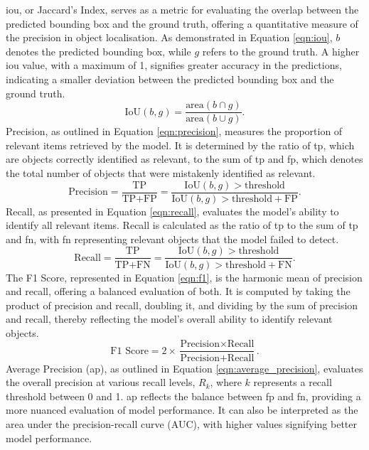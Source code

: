 \gls{iou}, or Jaccard’s Index, serves as a metric for evaluating the overlap between the predicted bounding box and the ground truth, offering a quantitative measure of the precision in object localisation. As demonstrated in Equation \ref{eqn:iou}, $b$ denotes the predicted bounding box, while $g$ refers to the ground truth. A higher \gls{iou} value, with a maximum of 1, signifies greater accuracy in the predictions, indicating a smaller deviation between the predicted bounding box and the ground truth.
\begin{equation}
\label{eqn:iou}
\text{IoU}(b, g) = \frac{{\text{area}(b \cap g)}}{{\text{area}(b \cup g)}}.
\end{equation}
Precision, as outlined in Equation \ref{eqn:precision}, measures the proportion of relevant items retrieved by the model. It is determined by the ratio of \gls{tp}, which are objects correctly identified as relevant, to the sum of \gls{tp} and \gls{fp}, which denotes the total number of objects that were mistakenly identified as relevant.
\begin{equation}
\text{Precision} = \frac{\text{TP}}{\text{TP} + \text{FP}} = \frac{\text{IoU}(b, g) > \text{threshold}}{\text{IoU}(b, g) > \text{threshold} + \text{FP}}.
\label{eqn:precision}
\end{equation}
\noindent
Recall, as presented in Equation \ref{eqn:recall}, evaluates the model's ability to identify all relevant items. Recall is calculated as the ratio of \gls{tp} to the sum of \gls{tp} and \gls{fn}, with \gls{fn} representing relevant objects that the model failed to detect.
\begin{equation}
\text{Recall} = \frac{\text{TP}}{\text{TP} + \text{FN}} = \frac{\text{IoU}(b, g) > \text{threshold}}{\text{IoU}(b, g) > \text{threshold} + \text{FN}}.
\label{eqn:recall}
\end{equation}
\noindent
The F1 Score, represented in Equation \ref{eqn:f1}, is the harmonic mean of precision and recall, offering a balanced evaluation of both. It is computed by taking the product of precision and recall, doubling it, and dividing by the sum of precision and recall, thereby reflecting the model's overall ability to identify relevant objects.
\begin{equation}
\text{F1 Score} = 2 \times \frac{\text{Precision} \times \text{Recall}}{\text{Precision} + \text{Recall}}.
\label{eqn:f1}
\end{equation}
\noindent
Average Precision (\gls{ap}), as outlined in Equation \ref{eqn:average_precision}, evaluates the overall precision at various recall levels, \( R_k \), where \( k \) represents a recall threshold between 0 and 1. \gls{ap} reflects the balance between \gls{fp} and \gls{fn}, providing a more nuanced evaluation of model performance. It can also be interpreted as the area under the precision-recall curve (AUC), with higher values signifying better model performance.
